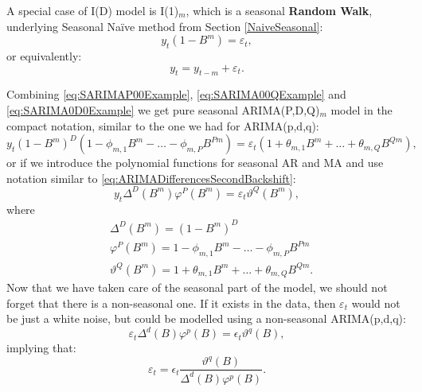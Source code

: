 \documentclass[]{book}
\theoremstyle{definition}
\theoremstyle{definition}
\theoremstyle{definition}
\theoremstyle{definition}
\theoremstyle{remark}
\begin{document}
A special case of I(D) model is I(1)\(_m\), which is a seasonal \textbf{Random Walk}, underlying Seasonal Naïve method from Section \ref{NaiveSeasonal}:
\begin{equation}
  y_t (1-B^m) = \varepsilon_t,
  \label{eq:SARIMA010Example1}
\end{equation}
or equivalently:
\begin{equation}
  y_t = y_{t-m} + \varepsilon_t.
  \label{eq:SARIMA010Example2}
\end{equation}

Combining \eqref{eq:SARIMAP00Example}, \eqref{eq:SARIMA00QExample} and \eqref{eq:SARIMA0D0Example} we get pure seasonal ARIMA(P,D,Q)\(_m\) model in the compact notation, similar to the one we had for ARIMA(p,d,q):
\begin{equation}
  y_t (1-B^m)^D (1 -\phi_{m,1} B^m -\dots -\phi_{m,P} B^{Pm}) = \varepsilon_t (1 + \theta_{m,1} B^m + \dots + \theta_{m,Q} B^{Qm}),
  \label{eq:SARIMAPDQ}
\end{equation}
or if we introduce the polynomial functions for seasonal AR and MA and use notation similar to \eqref{eq:ARIMADifferencesSecondBackshift}:
\begin{equation}
  y_t \Delta^D(B^m) \varphi^P(B^m) = \varepsilon_t \vartheta^Q(B^m),
  \label{eq:SARIMAPDQCompact}
\end{equation}
where
\begin{equation}
\begin{aligned}
  & \Delta^D(B^m) = (1-B^m)^D \\
  & \varphi^P(B^m) = 1 -\phi_{m,1} B^m -\dots -\phi_{m,P} B^{Pm} \\ 
  & \vartheta^Q(B^m) = 1 + \theta_{m,1} B^m + \dots + \theta_{m,Q} B^{Qm} .
\end{aligned}
  \label{eq:SARIMAPolynomials}
\end{equation}
Now that we have taken care of the seasonal part of the model, we should not forget that there is a non-seasonal one. If it exists in the data, then \(\varepsilon_t\) would not be just a white noise, but could be modelled using a non-seasonal ARIMA(p,d,q):
\begin{equation}
  \varepsilon_t \Delta^d(B) \varphi^p(B) = \epsilon_t \vartheta^q(B),
  \label{eq:ARIMApdqForError}
\end{equation}
implying that:
\begin{equation}
  \varepsilon_t = \epsilon_t \frac{\vartheta^q(B)}{\Delta^d(B) \varphi^p(B)}.
  \label{eq:ARIMApdqForErrorRewritten}
\end{equation}
\end{document}
